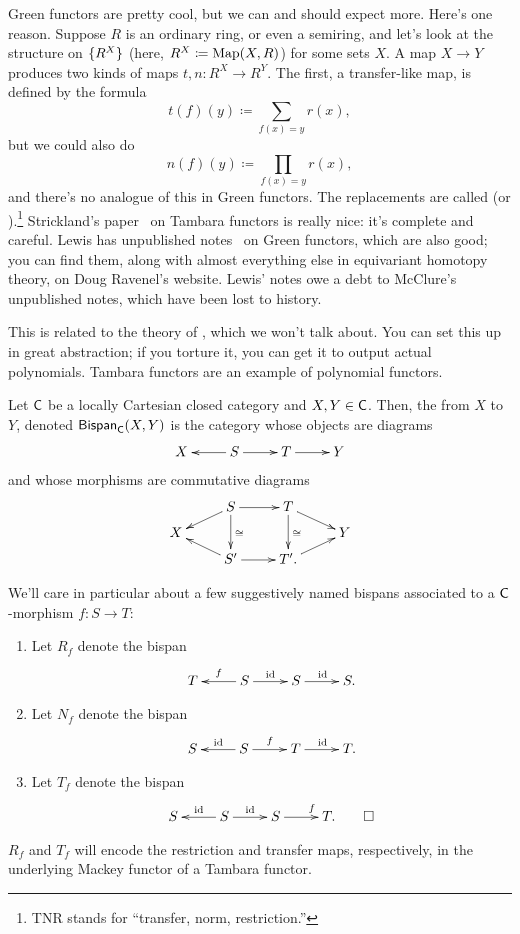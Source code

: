 Green functors are pretty cool, but we can and should expect more. Here's one reason. Suppose $R$ is an ordinary
ring, or even a semiring, and let's look at the structure on $\{R^X\}$ (here, $R^X\coloneqq \operatorname{Map}(X,R)$) for some
sets $X$. A map $X\to Y$ produces two kinds of maps $t, n\colon R^X\to R^Y$. The first, a transfer-like map, is
defined by the formula
\[t(f)(y)\coloneqq \sum_{f(x) = y} r(x),\]
but we could also do
\[n(f)(y)\coloneqq \prod_{f(x) = y} r(x),\]
and there's no analogue of this in Green functors. The replacements are called  (or
).\footnote{TNR stands for ``transfer, norm, restriction.''} Strickland's
paper~\cite{StricklandTambara} on Tambara functors is really nice: it's complete and careful. Lewis has unpublished
notes~\cite{LewisGreen} on Green functors, which are also good; you can find them, along with almost everything
else in equivariant homotopy theory, on Doug Ravenel's website. Lewis' notes owe a debt to McClure's unpublished
notes, which have been lost to history.
\begin{rem}
This is related to the theory of , which we won't talk about. You can set this up in
great abstraction; if you torture it, you can get it to output actual polynomials. Tambara functors are an example
of polynomial functors.
\end{rem}
\begin{defn}
Let $\mathsf C$ be a locally Cartesian closed category and $X,Y\in\mathsf C$. Then, the  from $X$ to
$Y$, denoted $\mathsf{Bispan}_\mathsf C(X,Y)$ is the category whose objects are diagrams
\[\xymatrix{
	X & S\ar[l]\ar[r] & T\ar[r] & Y
}\]
and whose morphisms are commutative diagrams
\[\xymatrix@R=0.2cm{
	& S\ar[r]\ar[dl]\ar[dd]^\cong & T\ar[dd]^\cong\ar[dr]\\
	X &&& Y\\
	& S'\ar[r]\ar[ul] & T'.\ar[ur]
}\]
\end{defn}
\begin{exm}
\label{suggest_name}
We'll care in particular about a few suggestively named bispans associated to a $\mathsf C$-morphism $f\colon S\to T$:
\begin{enumerate}
	\item Let $R_f$ denote the bispan
	\[\xymatrix{
		T & S\ar[l]_f\ar[r]^\id & S\ar[r]^\id & S.
	}\]
	\item Let $N_f$ denote the bispan
	\[\xymatrix{
		S & S\ar[l]_\id\ar[r]^f & T\ar[r]^\id & T.
	}\]
	\item Let $T_f$ denote the bispan
	\[\xymatrix{
		S & S\ar[l]_\id\ar[r]^\id & S\ar[r]^f & T.\qedhere
	}\]
\end{enumerate}
\end{exm}
$R_f$ and $T_f$ will encode the restriction and transfer maps, respectively, in the underlying Mackey functor of a
Tambara functor.

